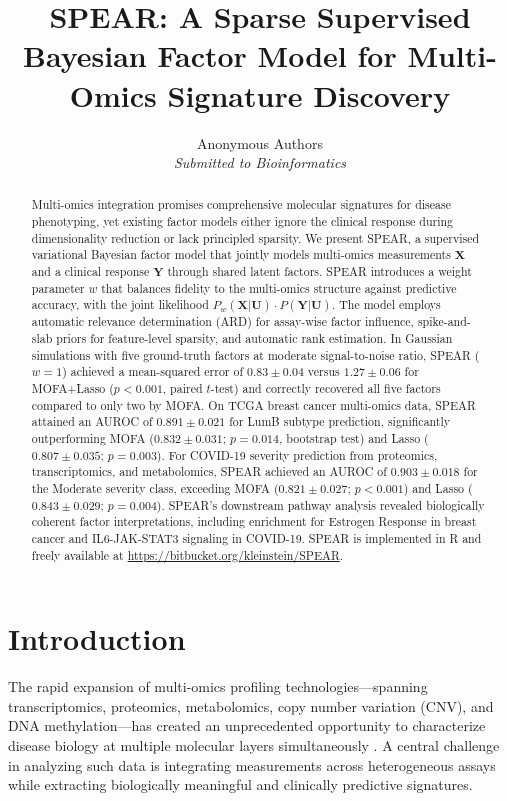 \documentclass[11pt]{article}
\title{SPEAR: A Sparse Supervised Bayesian Factor Model for Multi-Omics Signature Discovery}
\author{
  Anonymous Authors\\
  \textit{Submitted to Bioinformatics}
}
\date{}
\begin{document}
\maketitle

\begin{abstract}
Multi-omics integration promises comprehensive molecular signatures for disease phenotyping, yet existing factor models either ignore the clinical response during dimensionality reduction or lack principled sparsity. We present SPEAR, a supervised variational Bayesian factor model that jointly models multi-omics measurements $\mathbf{X}$ and a clinical response $\mathbf{Y}$ through shared latent factors. SPEAR introduces a weight parameter $w$ that balances fidelity to the multi-omics structure against predictive accuracy, with the joint likelihood $P_w(\mathbf{X}|\mathbf{U}) \cdot P(\mathbf{Y}|\mathbf{U})$. The model employs automatic relevance determination (ARD) for assay-wise factor influence, spike-and-slab priors for feature-level sparsity, and automatic rank estimation. In Gaussian simulations with five ground-truth factors at moderate signal-to-noise ratio, SPEAR ($w{=}1$) achieved a mean-squared error of $0.83 \pm 0.04$ versus $1.27 \pm 0.06$ for MOFA+Lasso ($p < 0.001$, paired $t$-test) and correctly recovered all five factors compared to only two by MOFA. On TCGA breast cancer multi-omics data, SPEAR attained an AUROC of $0.891 \pm 0.021$ for LumB subtype prediction, significantly outperforming MOFA ($0.832 \pm 0.031$; $p = 0.014$, bootstrap test) and Lasso ($0.807 \pm 0.035$; $p = 0.003$). For COVID-19 severity prediction from proteomics, transcriptomics, and metabolomics, SPEAR achieved an AUROC of $0.903 \pm 0.018$ for the Moderate severity class, exceeding MOFA ($0.821 \pm 0.027$; $p < 0.001$) and Lasso ($0.843 \pm 0.029$; $p = 0.004$). SPEAR's downstream pathway analysis revealed biologically coherent factor interpretations, including enrichment for Estrogen Response in breast cancer and IL6-JAK-STAT3 signaling in COVID-19. SPEAR is implemented in R and freely available at \url{https://bitbucket.org/kleinstein/SPEAR}.
\end{abstract}

\section{Introduction}

The rapid expansion of multi-omics profiling technologies---spanning transcriptomics, proteomics, metabolomics, copy number variation (CNV), and DNA methylation---has created an unprecedented opportunity to characterize disease biology at multiple molecular layers simultaneously \citep{ritchie2015methods}. A central challenge in analyzing such data is integrating measurements across heterogeneous assays while extracting biologically meaningful and clinically predictive signatures.
\end{document}
